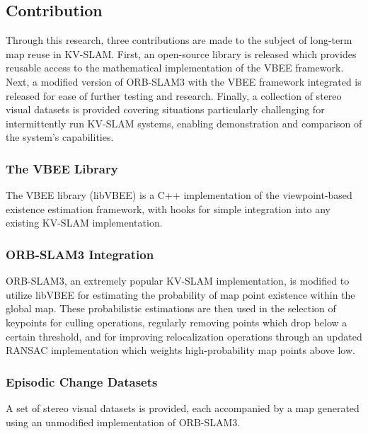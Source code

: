 \subsection{Contribution}

Through this research, three contributions are made to the subject of long-term map reuse in KV-SLAM. First, an open-source library is released which provides reusable access to the mathematical implementation of the VBEE framework. Next, a modified version of ORB-SLAM3 with the VBEE framework integrated is released for ease of further testing and research. Finally, a collection of stereo visual datasets is provided covering situations particularly challenging for intermittently run KV-SLAM systems, enabling demonstration and comparison of the system's capabilities.

\subsubsection{The VBEE Library}
The VBEE library (libVBEE) is a C++ implementation of the viewpoint-based existence estimation framework, with hooks for simple integration into any existing KV-SLAM implementation.  

\subsubsection{ORB-SLAM3 Integration}
ORB-SLAM3, an extremely popular KV-SLAM implementation, is modified to utilize libVBEE for estimating the probability of map point existence within the global map. These probabilistic estimations are then used in the selection of keypoints for culling operations, regularly removing points which drop below a certain threshold, and for improving relocalization operations through an updated RANSAC implementation which weights high-probability map points above low.

\subsubsection{Episodic Change Datasets}
A set of stereo visual datasets is provided, each accompanied by a map generated using an unmodified implementation of ORB-SLAM3.

